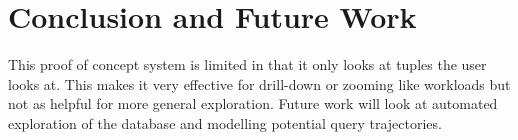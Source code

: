 \documentclass[sigconf, nonacm]{acmart}
\begin{document}
\section{Conclusion and Future Work}

This proof of concept system is limited in that it only looks at tuples the user looks at. This makes it very effective for drill-down or zooming like workloads but not as helpful for more general exploration. Future work will look at automated exploration of the database and modelling potential query trajectories.

\begin{acks}
\end{acks}




\end{document}
